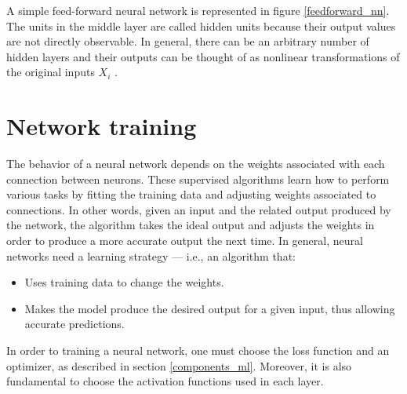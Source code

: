         
        
        A simple feed-forward neural network is represented in figure \ref{feedforward_nn}. The units in the middle layer are called hidden units because their output values are not directly observable. In general, there can be an arbitrary number of hidden layers and their outputs can be thought of as nonlinear transformations of the original inputs \(X_i\) \cite[393]{Hastie}.
        
    \section{Network training}
        The behavior of a neural network depends on the weights associated with each connection between neurons. These supervised algorithms learn how to perform various tasks by fitting the training data and adjusting weights associated to connections. In other words, given an input and the related output produced by the network, the algorithm takes the ideal output and adjusts the weights in order to produce a more accurate output the next time. In general, neural networks need a learning strategy --- i.e., an algorithm that:
        \begin{itemize}
            \item Uses training data to change the weights.
            \item Makes the model produce the desired output for a given input, thus allowing accurate predictions.
        \end{itemize}
        
        In order to training a neural network, one must choose the loss function and an optimizer, as described in section \ref{components_ml}. Moreover, it is also fundamental to choose the activation functions used in each layer.
        
